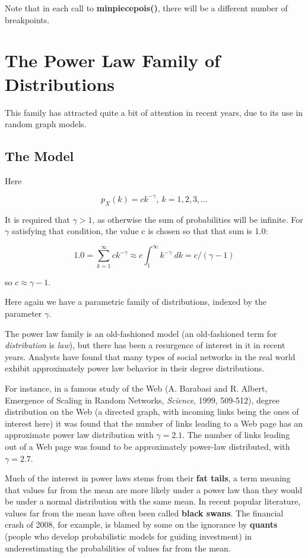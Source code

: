 Note that in each call to {\bf minpiecepois()}, there will be a
different number of breakpoints.

\section{The Power Law Family of Distributions}

This family has attracted quite a bit of attention in recent years, due
to its use in random graph models.

\subsection{The Model}

Here

\begin{equation}
p_X(k) = c k^{-\gamma}, ~ k = 1,2,3,...
\end{equation}

It is required that $\gamma > 1$, as otherwise the sum of probabilities
will be infinite.  For $\gamma$ satisfying that condition, the value c
is chosen so that that sum is 1.0:

\begin{equation}
1.0 = \sum_{k=1}^{\infty} c k^{-\gamma} \approx
c \int_1^{\infty} k^{-\gamma} ~ dk = c/(\gamma - 1)
\end{equation}

so $c \approx \gamma -1$.

Here again we have a parametric family of distributions, indexed by the
parameter $\gamma$.

The power law family is an old-fashioned model (an old-fashioned term
for {\it distribution} is {\it law}), but  there has been a resurgence
of interest in it in recent years.  Analysts have found that many types
of social networks in the real world exhibit approximately power law
behavior in their degree distributions.

For instance, in a famous study of the Web (A. Barabasi and R. Albert,
Emergence of Scaling in Random Networks, {\it Science}, 1999, 509-512),
degree distribution on the Web (a directed graph, with incoming links
being the ones of interest here) it was found that the number of links
leading to a Web page has an approximate power law distribution with
$\gamma =2.1$.  The number of links leading out of a Web page was found
to be approximately power-law distributed, with $\gamma = 2.7$.

Much of the interest in power laws stems from their {\bf fat tails}, a
term meaning that values far from the mean are more likely under a power
law than they would be under a normal distribution with the same mean.
In recent popular literature, values far from the mean have often been
called {\bf black swans}.  The financial crash of 2008, for example, is
blamed by some on the ignorance by {\bf quants} (people who develop
probabilistic models for guiding investment) in underestimating the
probabilities of values far from the mean.

